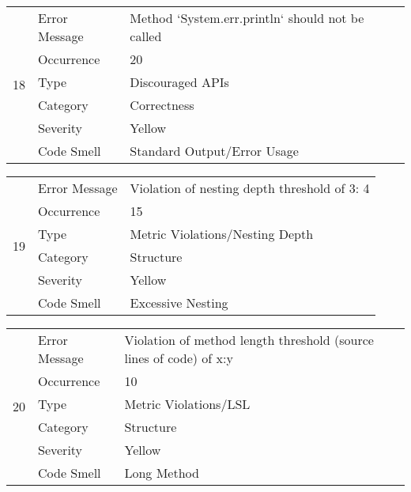 \documentclass[12pt,english]{article}
\begin{document}
\begin{table}[!ht]
    \begin{tabularx}{\textwidth}{|c|l|X|}
    \hline
        \multirow{6}{*}{18} & Error Message & Method `System.err.println` should not be called \\ \cline{2-3}
        & Occurrence & 20 \\ \cline{2-3}
        & Type & Discouraged APIs \\ \cline{2-3}
        & Category & Correctness \\ \cline{2-3}
        & Severity & Yellow \\ \cline{2-3}
        & Code Smell & Standard Output/Error Usage \\ \hline
    \end{tabularx}
\end{table}

\begin{table}[!ht]
    \begin{tabularx}{\textwidth}{|c|l|X|}
    \hline
        \multirow{6}{*}{19} & Error Message & Violation of nesting depth threshold of 3: 4 \\ \cline{2-3}
        & Occurrence & 15 \\ \cline{2-3}
        & Type & Metric Violations/Nesting Depth \\ \cline{2-3}
        & Category & Structure \\ \cline{2-3}
        & Severity & Yellow \\ \cline{2-3}
        & Code Smell & Excessive Nesting \\ \hline
    \end{tabularx}
\end{table}

\begin{table}[!ht]
    \begin{tabularx}{\textwidth}{|c|l|X|}
    \hline
        \multirow{6}{*}{20} & Error Message & Violation of method length threshold (source lines of code) of x:y \\ \cline{2-3}
        & Occurrence & 10 \\ \cline{2-3}
        & Type & Metric Violations/LSL \\ \cline{2-3}
        & Category & Structure \\ \cline{2-3}
        & Severity & Yellow \\ \cline{2-3}
        & Code Smell & Long Method \\ \hline
    \end{tabularx}
\end{table}
\end{document}
